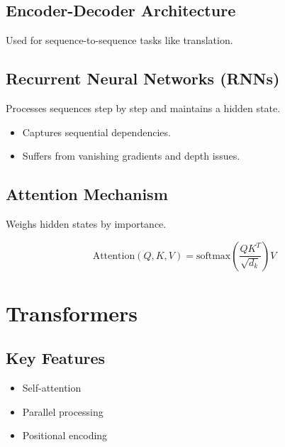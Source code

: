 \subsection{Encoder-Decoder Architecture}
Used for sequence-to-sequence tasks like translation.

\subsection{Recurrent Neural Networks (RNNs)}
Processes sequences step by step and maintains a hidden state.

\begin{itemize}
    \item Captures sequential dependencies.
    \item Suffers from vanishing gradients and depth issues.
\end{itemize}

\subsection{Attention Mechanism}
Weighs hidden states by importance.

\[
\text{Attention}(Q, K, V) = \text{softmax}\left( \frac{QK^T}{\sqrt{d_k}} \right)V
\]

\section{Transformers}

\subsection{Key Features}
\begin{itemize}
    \item Self-attention
    \item Parallel processing
    \item Positional encoding
\end{itemize}


